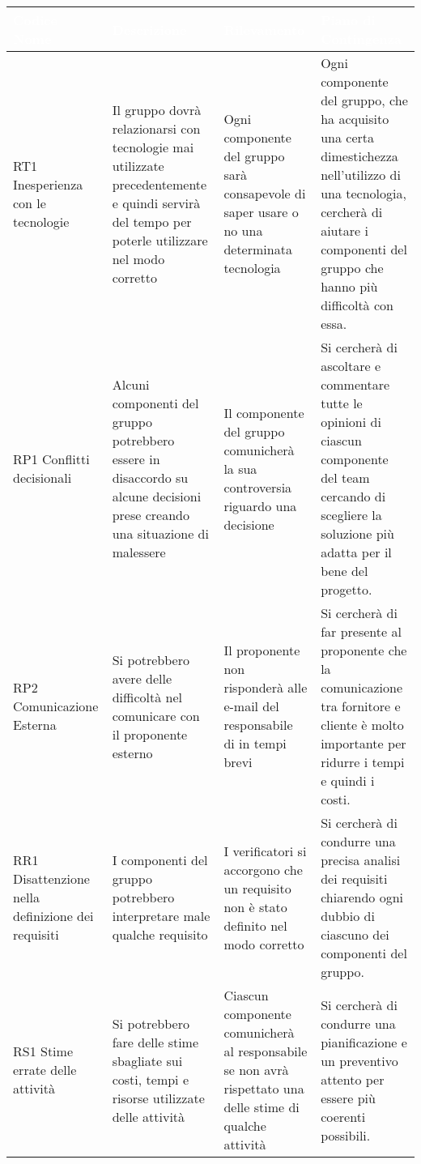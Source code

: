 {
\renewcommand{\arraystretch}{2}
\centering
\begin{longtable}{ C{2cm} C{4.5cm} C{4.5cm} C{4.5cm}}
	\textcolor{white}{\textbf{Codice Nome}} & 
	\textcolor{white}{\textbf{Descrizione}} & 
	\textcolor{white}{\textbf{Rilevamento}} &  
	\textcolor{white}{\textbf{Piano di Contingenza}}\\	
\endhead


RT1 Inesperienza con le tecnologie & Il gruppo dovrà relazionarsi con tecnologie mai utilizzate precedentemente e quindi servirà del tempo per poterle utilizzare nel modo corretto & Ogni componente del gruppo sarà consapevole di saper usare o no una determinata tecnologia & Ogni componente del gruppo, che ha acquisito una certa dimestichezza nell'utilizzo di una tecnologia, cercherà di aiutare i componenti del gruppo che hanno più difficoltà con essa. \\

RP1 Conflitti decisionali & Alcuni componenti del gruppo potrebbero essere in disaccordo su alcune decisioni prese creando una situazione di malessere & Il componente del gruppo comunicherà la sua controversia riguardo una decisione  & Si cercherà di ascoltare e commentare tutte le opinioni di ciascun componente del team cercando di scegliere la soluzione più adatta per il bene del progetto. \\ 

RP2 Comunicazione Esterna & Si potrebbero avere delle difficoltà nel comunicare con il proponente esterno & Il proponente non risponderà alle e-mail del responsabile di \Gruppo{} in tempi brevi & Si cercherà di far presente al proponente \ZD{} che la comunicazione tra fornitore e cliente è molto importante per ridurre i tempi e quindi i costi. \\

RR1 Disattenzione nella definizione dei requisiti & I componenti del gruppo potrebbero interpretare male qualche requisito & I verificatori si accorgono che un requisito non è stato definito nel modo corretto & Si cercherà di condurre una precisa analisi dei requisiti chiarendo ogni dubbio di ciascuno dei componenti del gruppo. \\

RS1 Stime errate delle attività & Si potrebbero fare delle stime sbagliate sui costi, tempi e risorse utilizzate delle attività & Ciascun componente comunicherà al responsabile se non avrà rispettato una delle stime di qualche attività & Si cercherà di condurre una pianificazione e un preventivo attento per essere più coerenti possibili. \\



\end{longtable}}
